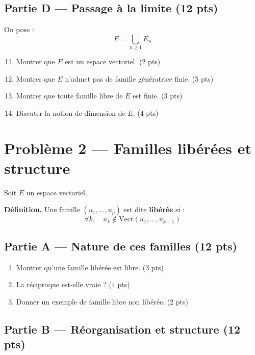 \documentclass[11pt,a4paper]{article}
\begin{document}
\subsection*{Partie D — Passage à la limite (12 pts)}

On pose :
\[
E = \bigcup_{n \geq 1} E_n
\]

\begin{enumerate}
\setcounter{enumi}{10}
\item Montrer que $E$ est un espace vectoriel. \hfill (2 pts)
\item Montrer que $E$ n’admet pas de famille génératrice finie. \hfill (5 pts)
\item Montrer que toute famille libre de $E$ est finie. \hfill (3 pts)
\item Discuter la notion de dimension de $E$. \hfill (4 pts)
\end{enumerate}

\bigskip

\section*{Problème 2 — Familles libérées et structure}

Soit $E$ un espace vectoriel.

\textbf{Définition.} Une famille $(u_1,\dots,u_p)$ est dite \textbf{libérée} si :
\[
\forall k,\quad u_k \notin \mathrm{Vect}(u_1,\dots,u_{k-1})
\]

\subsection*{Partie A — Nature de ces familles (12 pts)}

\begin{enumerate}
\item Montrer qu’une famille libérée est libre. \hfill (3 pts)
\item La réciproque est-elle vraie ? \hfill (4 pts)
\item Donner un exemple de famille libre non libérée. \hfill (2 pts)
\end{enumerate}

\subsection*{Partie B — Réorganisation et structure (12 pts)}
\end{document}
